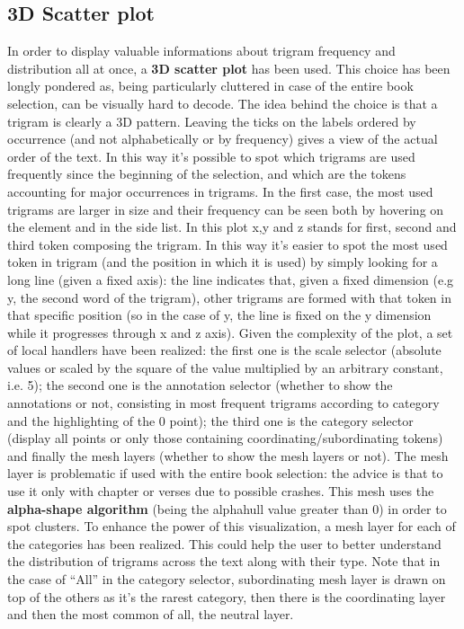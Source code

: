 \documentclass[sigchi]{article}
\begin{document}
\subsection{3D Scatter plot}
In order to display valuable informations about trigram frequency and distribution all at once, a \textbf{3D scatter plot} \cite{3Dscatter} has been used. This choice has been longly pondered as, being particularly cluttered in case of the entire book selection, can be visually hard to decode. The idea behind the choice is that a trigram is clearly a 3D pattern. Leaving the ticks on the labels ordered by occurrence (and not alphabetically or by frequency) gives a view of the actual order of the text. In this way it’s possible to spot which trigrams are used frequently since the beginning of the selection, and which are the tokens accounting for major occurrences in trigrams. In the first case, the most used trigrams are larger in size and their frequency can be seen both by hovering on the element and in the side list. In this plot x,y and z stands for first, second and third token composing the trigram. In this way it’s easier to spot the most used token in trigram (and the position in which it is used) by simply looking for a long line (given a fixed axis): the line indicates that, given a fixed dimension (e.g y, the second word of the trigram), other trigrams are formed with that token in that specific position (so in the case of y, the line is fixed on the y dimension while it progresses through x and z axis). 
Given the complexity of the plot, a set of local handlers have been realized: 
the first one is the scale selector (absolute values or scaled by the square of the value multiplied by an arbitrary constant, i.e. 5); the second one is the annotation selector (whether to show the annotations or not, consisting in most frequent trigrams according to category and the highlighting of the 0 point); the third one is the category selector (display all points or only those containing coordinating/subordinating tokens) and finally the mesh layers (whether to show the mesh layers or not).
The mesh layer is problematic if used with the entire book selection: the advice is that to use it only with chapter or verses due to possible crashes. This mesh uses the \textbf{alpha-shape algorithm} \cite{alphashapealg} (being the alphahull value greater than 0) in order to spot clusters. To enhance the power of this visualization, a mesh layer for each of the categories has been realized. This could help the user to better understand the distribution of trigrams across the text along with their type. Note that in the case of “All” in the  category selector, subordinating mesh layer is drawn on top of the others as it’s the rarest category, then there is the coordinating layer and then the most common of all, the neutral layer.
\end{document}
